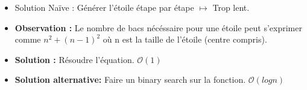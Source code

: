 \begin{frame}
    \frametitle{\problemtitle}
    \begin{itemize}
        \begin{block}{Problème}
            On a $n$ bacs, déterminer la taille de l'étoile.
        \end{block}
        \item<+-> Solution Naïve : Générer l'étoile étape par étape $\mapsto$ Trop lent.
        \item<+-> \textbf{Observation :} Le nombre de bacs nécéssaire pour une étoile peut s'exprimer comme $n^2 + (n-1)^2$ où n est la taille de l'étoile (centre compris).
        \item<+-> \textbf{Solution :} Résoudre l'équation. $\mathcal{O}(1)$
        \item<+-> \textbf{Solution alternative:} Faire un binary search sur la fonction. $\mathcal{O}(log n)$
    \end{itemize}
    \solvestats
\end{frame}
